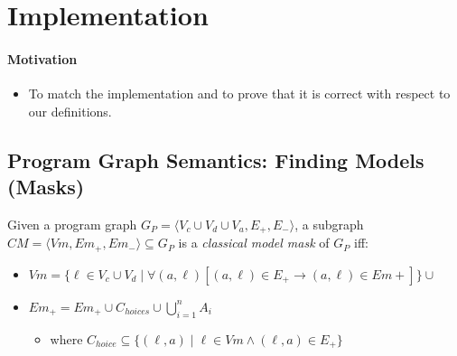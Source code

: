 

\section{Implementation}

\paragraph{Motivation}
\begin{itemize}
  \item To match the implementation and to prove that it is correct with respect to our definitions.
\end{itemize}

\subsection{Program Graph Semantics: Finding Models (Masks)}
\begin{definition}
  Given a program graph $G_P = \langle V_c \cup V_d \cup V_a, E_{+}, E_{-} \rangle$,
  a subgraph $CM = \langle Vm, Em_{+}, Em_{-} \rangle \subseteq G_P$ is a \emph{classical model mask} of $G_P$
  iff:
  \begin{itemize}
    \item
    $Vm =
      \{ \ell \in V_c \cup V_d \mid \forall (a,\ell) [(a,\ell) \in E_{+} \rightarrow (a,\ell) \in Em{+}] \} \cup
    $
    \item $Em_{+} = Em_{+} \cup C_{hoices} \cup \bigcup_{i=1}^{n} A_i
    $

  \begin{itemize}
    \item where $C_{hoice} \subseteq \{ (\ell, a) \mid \ell \in Vm \land (\ell, a) \in E_{+} \}$
  \end{itemize}
\end{itemize}

\end{definition}

